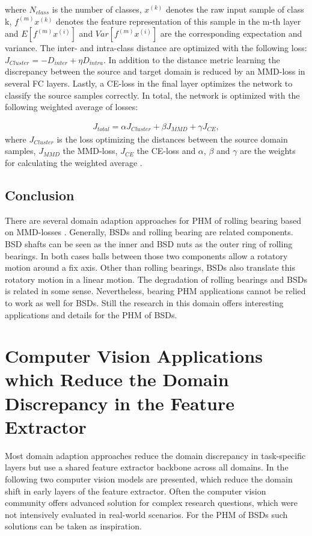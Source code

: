where $N_{class}$ is the number of classes, $x^{(k)}$ denotes the raw input sample of class k, $f^{(m)}x^{(k)}$ denotes the feature representation of this sample in the m-th layer and $E[f^{(m)}x^{(i)}]$ and $Var[f^{(m)}x^{(i)}]$ are the corresponding expectation and variance. The inter- and intra-class distance are optimized with the following loss: $J_{Cluster} = - D_{inter} + \eta D_{intra}$. In addition to the distance metric learning the discrepancy between the source and target domain is reduced by an MMD-loss in several FC layers. Lastly, a CE-loss in the final layer optimizes the network to classify the source samples correctly. In total, the network is optimized with the following weighted average of losses: 

\begin{equation}
    \begin{aligned}
    J_{total} = \alpha J_{Cluster} + \beta J_{MMD} + \gamma J_{CE}, 
    \end{aligned}
\end{equation}
where $J_{Cluster}$ is the loss optimizing the distances between the source domain samples, $J_{MMD}$ the MMD-loss,  $J_{CE}$ the CE-loss and $\alpha$, $\beta$ and $\gamma$ are the weights for calculating the weighted average \cite{Li2018}.

\subsection{Conclusion}
There are several domain adaption approaches for PHM of rolling bearing based on MMD-losses \cite{AN201942} \cite{Li2018} \cite{Guo2019} \cite{Singh2019} \cite{Kang2020}. Generally, BSDs and rolling bearing are related components. BSD shafts can be seen as the inner and BSD nuts as the outer ring of rolling bearings. In both cases balls between those two components allow a rotatory motion around a fix axis. Other than rolling bearings, BSDs also translate this rotatory motion in a linear motion. The degradation of rolling bearings and BSDs is related in some sense. Nevertheless, bearing PHM applications cannot be relied to work as well for BSDs. Still the research in this domain offers interesting applications and details for the PHM of BSDs. 




\section{Computer Vision Applications which Reduce the Domain Discrepancy in the Feature Extractor}
Most domain adaption approaches reduce the domain discrepancy in task-specific layers but use a shared feature extractor backbone across all domains. In the following two computer vision models are presented, which reduce the domain shift in early layers of the feature extractor. Often the computer vision community offers advanced solution for complex research questions, which were not intensively evaluated in real-world scenarios. For the PHM of BSDs such solutions can be taken as inspiration.

